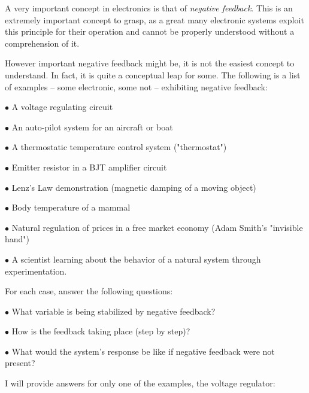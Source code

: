 

A very important concept in electronics is that of {\it negative feedback}.  This is an extremely important concept to grasp, as a great many electronic systems exploit this principle for their operation and cannot be properly understood without a comprehension of it.

However important negative feedback might be, it is not the easiest concept to understand.  In fact, it is quite a conceptual leap for some.  The following is a list of examples -- some electronic, some not -- exhibiting negative feedback:

\medskip
\goodbreak
\item{$\bullet$} A voltage regulating circuit
\item{$\bullet$} An auto-pilot system for an aircraft or boat
\item{$\bullet$} A thermostatic temperature control system ("thermostat")
\item{$\bullet$} Emitter resistor in a BJT amplifier circuit
\item{$\bullet$} Lenz's Law demonstration (magnetic damping of a moving object)
\item{$\bullet$} Body temperature of a mammal
\item{$\bullet$} Natural regulation of prices in a free market economy (Adam Smith's "invisible hand")
\item{$\bullet$} A scientist learning about the behavior of a natural system through experimentation.
\medskip

For each case, answer the following questions:

\medskip
\goodbreak
\item{$\bullet$} What variable is being stabilized by negative feedback?
\item{$\bullet$} How is the feedback taking place (step by step)?
\item{$\bullet$} What would the system's response be like if negative feedback were not present?
\medskip







I will provide answers for only one of the examples, the voltage regulator:


